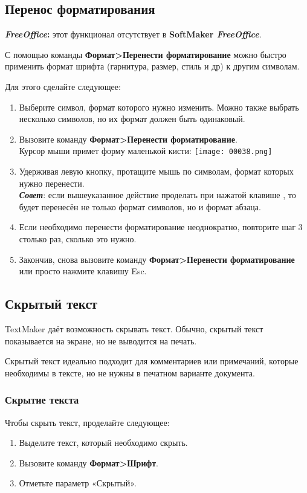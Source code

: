 ﻿\documentclass[a4paper,10pt]{article}
\begin{document}
\subsection{Перенос форматирования}

\begin{mdframed}[backgroundcolor=pink!50]
\textbf{\textit{FreeOffice}:} этот функционал отсутствует в \textbf{SoftMaker \textit{FreeOffice}}.
\end{mdframed}

С помощью команды \textbf{Формат>Перенести форматирование} можно быстро применить формат шрифта (гарнитура, размер, стиль и др) к другим символам.

Для этого сделайте следующее:
\begin{enumerate}
 \item Выберите символ, формат которого нужно изменить. Можно также выбрать несколько символов, но их формат должен быть одинаковый.
 \item Вызовите команду \textbf{Формат>Перенести форматирование}.\\
Курсор мыши примет форму маленькой кисти: \texttt{[image: 00038.png]}
\item Удерживая левую кнопку, протащите мышь по символам, формат которых нужно перенести.\\
\textit{\textbf{Совет}}: если вышеуказанное действие проделать при нажатой клавише , то будет перенесён не только формат символов, но и формат абзаца.
\item Если необходимо перенести форматирование неоднократно, повторите шаг 3 столько раз, сколько это нужно.
\item Закончив, снова вызовите команду \textbf{Формат>Перенести форматирование} или просто нажмите клавишу Esc.
\end{enumerate}

\subsection{Скрытый текст} \label{sec:скрытыйтекст}
TextMaker даёт возможность скрывать текст. Обычно, скрытый текст показывается на экране, но не выводится на печать.

Скрытый текст идеально подходит для комментариев или примечаний, которые необходимы в тексте, но не нужны в печатном варианте документа.

\subsubsection{Скрытие текста}
Чтобы скрыть текст, проделайте следующее:
\begin{enumerate}
 \item Выделите текст, который необходимо скрыть.
 \item Вызовите команду \textbf{Формат>Шрифт}.
 \item Отметьте параметр «Скрытый».
\end{enumerate}
\end{document}
